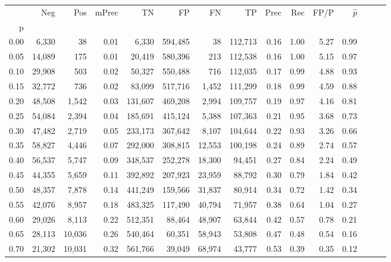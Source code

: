 \begin{tabular}{rrrrrrrrrrrrrrr}
\toprule
{} &     Neg &     Pos & mPrec &       TN &       FP &       FN &       TP &  Prec &   Rec &  FP/P & $\hat{p}$ \\
p    &         &         &       &          &          &          &          &       &       &       &           \\
\midrule
0.00 &   6,330 &      38 &  0.01 &    6,330 &  594,485 &       38 &  112,713 &  0.16 &  1.00 &  5.27 &      0.99 \\
0.05 &  14,089 &     175 &  0.01 &   20,419 &  580,396 &      213 &  112,538 &  0.16 &  1.00 &  5.15 &      0.97 \\
0.10 &  29,908 &     503 &  0.02 &   50,327 &  550,488 &      716 &  112,035 &  0.17 &  0.99 &  4.88 &      0.93 \\
0.15 &  32,772 &     736 &  0.02 &   83,099 &  517,716 &    1,452 &  111,299 &  0.18 &  0.99 &  4.59 &      0.88 \\
0.20 &  48,508 &   1,542 &  0.03 &  131,607 &  469,208 &    2,994 &  109,757 &  0.19 &  0.97 &  4.16 &      0.81 \\
0.25 &  54,084 &   2,394 &  0.04 &  185,691 &  415,124 &    5,388 &  107,363 &  0.21 &  0.95 &  3.68 &      0.73 \\
0.30 &  47,482 &   2,719 &  0.05 &  233,173 &  367,642 &    8,107 &  104,644 &  0.22 &  0.93 &  3.26 &      0.66 \\
0.35 &  58,827 &   4,446 &  0.07 &  292,000 &  308,815 &   12,553 &  100,198 &  0.24 &  0.89 &  2.74 &      0.57 \\
0.40 &  56,537 &   5,747 &  0.09 &  348,537 &  252,278 &   18,300 &   94,451 &  0.27 &  0.84 &  2.24 &      0.49 \\
0.45 &  44,355 &   5,659 &  0.11 &  392,892 &  207,923 &   23,959 &   88,792 &  0.30 &  0.79 &  1.84 &      0.42 \\
0.50 &  48,357 &   7,878 &  0.14 &  441,249 &  159,566 &   31,837 &   80,914 &  0.34 &  0.72 &  1.42 &      0.34 \\
0.55 &  42,076 &   8,957 &  0.18 &  483,325 &  117,490 &   40,794 &   71,957 &  0.38 &  0.64 &  1.04 &      0.27 \\
0.60 &  29,026 &   8,113 &  0.22 &  512,351 &   88,464 &   48,907 &   63,844 &  0.42 &  0.57 &  0.78 &      0.21 \\
0.65 &  28,113 &  10,036 &  0.26 &  540,464 &   60,351 &   58,943 &   53,808 &  0.47 &  0.48 &  0.54 &      0.16 \\
0.70 &  21,302 &  10,031 &  0.32 &  561,766 &   39,049 &   68,974 &   43,777 &  0.53 &  0.39 &  0.35 &      0.12 \\

\end{tabular}
